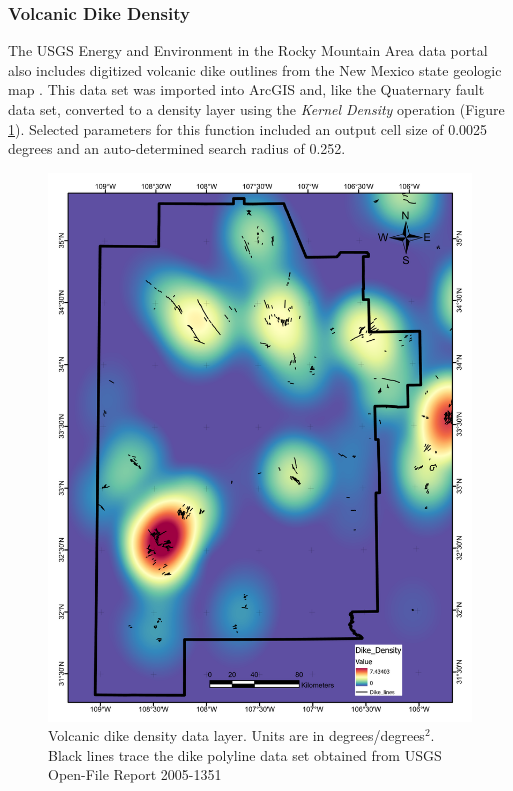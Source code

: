 \subsubsection{Volcanic Dike Density}

The USGS Energy and Environment in the Rocky Mountain Area data portal \citep{usgs_eerma_2021} also includes digitized volcanic dike outlines from the New Mexico state geologic map \citep{stoeser_usgs_2005}. This data set was imported into ArcGIS and, like the Quaternary fault data set, converted to a density layer using the \textit{Kernel Density} operation (Figure \ref{fig:feat_dikes}). Selected parameters for this function included an output cell size of 0.0025 degrees and an auto-determined search radius of 0.252.

\begin{figure}[!htp]
\centering
\includegraphics[scale=.50]{templates/images/Figure-DikeDensity.pdf}
\caption[Volcanic dike data layer]{Volcanic dike density data layer. Units are in degrees/degrees$^2$. Black lines trace the dike polyline data set obtained from USGS Open-File Report 2005-1351 \protect\citep{stoeser_usgs_2005}}
\label{fig:feat_dikes}
\end{figure}


